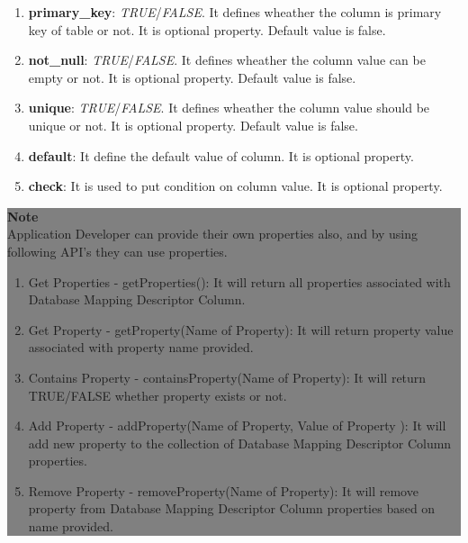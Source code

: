 \begin{enumerate}
\begin{enumerate}
			\item \small \textbf{primary\_key}: \textit{TRUE}/\textit{FALSE}. It defines wheather the column is primary key of table or not. It is optional property. Default value is false.
			\item \small \textbf{not\_null}: \textit{TRUE}/\textit{FALSE}. It defines wheather the column value can be empty or not. It is optional property. Default value is false.
			\item \small \textbf{unique}: \textit{TRUE}/\textit{FALSE}. It defines wheather the column value should be unique or not. It is optional property. Default value is false.
			\item \small \textbf{default}: It define the default value of column. It is optional property.
			\item \small \textbf{check}: It is used to put condition on column value. It is optional property.

		\end{enumerate}

			\begin{center}
				\colorbox{grey}{
					\parbox[t]{.8\linewidth}{
						\fontsize{11pt}{11pt}\selectfont %
						\vspace*{0.1cm} %
		
						\hfill \textbf{Note} \\

			
						Application Developer can provide their own properties also, and by using following API's they can use properties.

						\hfill 	
						\begin{enumerate}
							\item \small Get Properties - getProperties(): It will return all properties associated with Database Mapping Descriptor Column.
							\item \small Get Property - getProperty(Name of Property): It will return property value associated with property name provided.
							\item \small Contains Property - containsProperty(Name of Property): It will return TRUE/FALSE whether property exists or not.
							\item \small Add Property - addProperty(Name of Property, Value of Property ): It will add new property to the  collection of Database Mapping Descriptor Column properties.
							\item \small Remove Property - removeProperty(Name of Property): It will remove property from Database Mapping Descriptor Column properties based on name provided.
						\end{enumerate}

}}
\end{center}
\end{enumerate}
